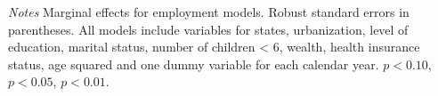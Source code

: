 \documentclass[12pt,english]{article}
\begin{document}
{\begin{table}[!ht]
\begin{center}
\begin{adjustbox}{max width=\linewidth}
\begin{threeparttable}
{\begin{tabular}{l*{6}{S S}}
						\bottomrule
					\end{tabular}
					\begin{tablenotes}
						\item \footnotesize \textit{Notes}  Marginal effects for employment models. Robust standard errors in parentheses. All models include variables for  states, urbanization, level of education, marital status, number of children < 6, wealth, health insurance status, age squared and one dummy variable for each calendar year. \sym{*} \(p<0.10\), \sym{**} \(p<0.05\), \sym{***} \(p<0.01\).
					\end{tablenotes}
				}
			\end{threeparttable}
		\end{adjustbox}
	\end{center}
\end{table} 

\clearpage

}
\end{document}
